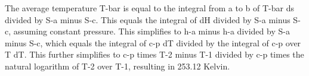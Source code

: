 The average temperature T-bar is equal to the integral from a to b of T-bar ds divided by S-a minus S-c. This equals the integral of dH divided by S-a minus S-c, assuming constant pressure. This simplifies to h-a minus h-a divided by S-a minus S-c, which equals the integral of c-p dT divided by the integral of c-p over T dT. This further simplifies to c-p times T-2 minus T-1 divided by c-p times the natural logarithm of T-2 over T-1, resulting in 253.12 Kelvin.
